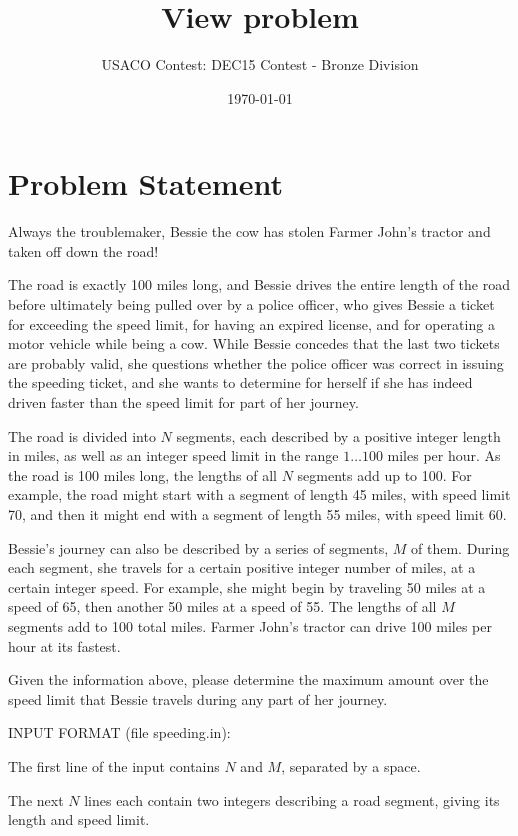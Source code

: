 \documentclass[12pt]{article}
\title{View problem}
\author{USACO Contest: DEC15 Contest - Bronze Division}
\date{\today}
\begin{document}
\maketitle

\section*{Problem Statement}

Always the troublemaker, Bessie the cow has stolen Farmer John's tractor and
taken off down the road!

The road is exactly 100 miles long, and Bessie drives the entire
length of the road before ultimately being pulled over by a police
officer, who gives Bessie a ticket for exceeding the speed limit, for
having an expired license, and for operating a motor vehicle while
being a cow.  While Bessie concedes that the last two tickets are
probably valid, she questions whether the police officer was correct
in issuing the speeding ticket, and she wants to determine for herself
if she has indeed driven faster than the speed limit for part of her
journey.  

The road is divided into $N$ segments, each described by a positive
integer length in miles, as well as an integer speed limit in the
range $1 \ldots 100$ miles per hour.  As the road is 100 miles long,
the lengths of all $N$ segments add up to 100.  For example, the road
might start with a segment of length 45 miles, with speed limit 70,
and then it might end with a segment of length 55 miles, with speed
limit 60.

Bessie's journey can also be described by a series of segments, $M$
of them.  During each segment, she travels for a certain positive
integer number of miles, at a certain integer speed.  For example, she
might begin by traveling 50 miles at a speed of 65, then another 50
miles at a speed of 55.  The lengths of all $M$ segments add to 100
total miles.  Farmer John's tractor can drive 100 miles per hour at
its fastest.

Given the information above, please determine the maximum amount
over the speed limit that Bessie travels during any part of her
journey.  

INPUT FORMAT (file speeding.in):

The first line of the input contains $N$ and $M$, separated by a space.

The next $N$ lines each contain two integers describing a road segment, giving
its length and speed limit.
\end{document}
